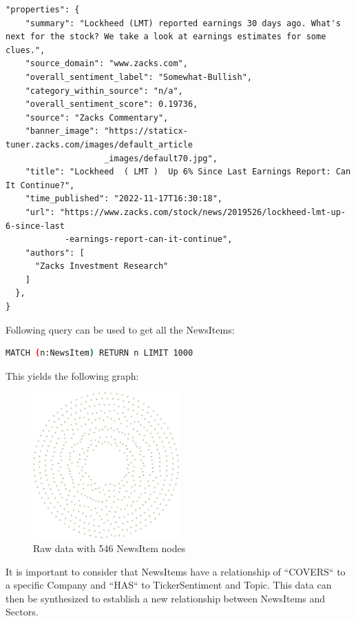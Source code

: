 \begin{lstlisting}[caption={Example properties of a NewsItem}, captionpos=b, label={lst:example-properties-newsitem}]
"properties": {
    "summary": "Lockheed (LMT) reported earnings 30 days ago. What's next for the stock? We take a look at earnings estimates for some clues.",
    "source_domain": "www.zacks.com",
    "overall_sentiment_label": "Somewhat-Bullish",
    "category_within_source": "n/a",
    "overall_sentiment_score": 0.19736,
    "source": "Zacks Commentary",
    "banner_image": "https://staticx-tuner.zacks.com/images/default_article
                    _images/default70.jpg",
    "title": "Lockheed  ( LMT )  Up 6% Since Last Earnings Report: Can It Continue?",
    "time_published": "2022-11-17T16:30:18",
    "url": "https://www.zacks.com/stock/news/2019526/lockheed-lmt-up-6-since-last
            -earnings-report-can-it-continue",
    "authors": [
      "Zacks Investment Research"
    ]
  },
}
\end{lstlisting}

Following query can be used to get all the NewsItems:

\begin{lstlisting}[caption=Get all NewsItem Cypher Query, captionpos=b, language=bash, label={lst:getall-newsitem-cypher}]
MATCH (n:NewsItem) RETURN n LIMIT 1000
\end{lstlisting}

\noindent This yields the following graph:

\begin{figure}[h]
 \centering
 \includegraphics[width=0.5\textwidth]{images/newsItemsAll.png}
 \caption{Raw data with 546 NewsItem nodes }
 \label{fig:raw-data-546-newsitem-nodes}
\end{figure}

It is important to consider that NewsItems have a relationship of ``COVERS`` to a specific Company and ``HAS`` to TickerSentiment and Topic. This data can then be synthesized to establish a new relationship between NewsItems and Sectors.

